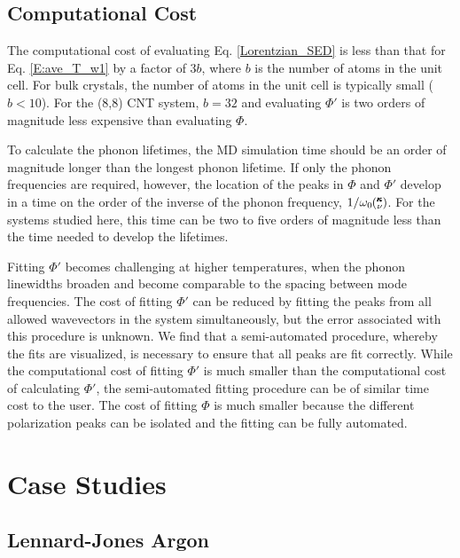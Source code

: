\documentclass[aps,prb,preprint,superscriptaddress,amsmath,amssymb,floatfix]{revtex4}
\newcommand{\kv}{\mspace{-4.0mu}\left(\mspace{-8.0mu}\begin{smallmatrix}&\pmb{\kappa} \\&\nu\end{smallmatrix}\mspace{-3.0mu}\right)}
\begin{document}
\subsection{\label{Subsection_Comp_Details_4}Computational Cost}

The computational cost of evaluating Eq. \eqref{Lorentzian_SED} is less than that for Eq$.$ \eqref{E:ave_T_w1} by a factor of $3b$, where $b$ is the number of atoms in the unit cell.  For bulk crystals, the number of atoms in the unit cell is typically small ($b<10$).  For the (8,8) CNT system, $b=32$ and evaluating $\Phi'$ is two orders of magnitude less expensive than evaluating $\Phi$.

To calculate the phonon lifetimes, the MD simulation time should be an order of magnitude longer than the longest phonon lifetime.\cite{thomasthesis}  If only the phonon frequencies are required, however, the location of the peaks in $\Phi$ and $\Phi'$ develop in a time on the order of the inverse of the phonon frequency, $1/\omega_0\kv$. For the systems studied here, this time can be two to five orders of magnitude less than the time needed to develop the lifetimes.

Fitting $\Phi'$ becomes challenging at higher temperatures, when the phonon linewidths broaden and become comparable to the spacing between mode frequencies. The cost of fitting $\Phi'$ can be reduced by fitting the peaks from all allowed wavevectors in the system simultaneously, but the error associated with this procedure is unknown.\cite{shiomi2011a} We find that a semi-automated procedure, whereby the fits are visualized, is necessary to ensure that all peaks are fit correctly.  While the computational cost of fitting $\Phi'$ is much smaller than the computational cost of calculating $\Phi'$, the semi-automated fitting procedure can be of similar time cost to the user. The cost of fitting $\Phi$ is much smaller because the different polarization peaks can be isolated and the fitting can be fully automated.

\section{\label{S:Section_Prop}Case Studies}

\subsection{\label{S:Subsection_prop_LJ}Lennard-Jones Argon}
\end{document}
